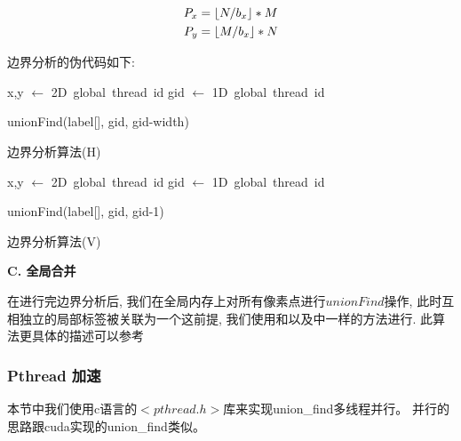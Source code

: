 \documentclass[a4paper, 11pt]{article}
\DeclarePairedDelimiter{\floor}{\lfloor}{\rfloor}
\begin{document}
\begin{equation}
\begin{split}
P_x &= \floor{N/b_x} * M \\
P_y &= \floor{M/b_x} * N
\end{split}
\end{equation}

边界分析的伪代码如下:

\begin{algorithm}[H]
	\DontPrintSemicolon
	x,y $\gets$ 2D\ global\ thread\ id \;
	gid $\gets$ 1D\ global\ thread\ id \;
	
	
	 {
		unionFind(label[], gid, gid-width)\;
	}
	\caption{边界分析算法(H)}
	\label{code:cuda_uf_2}
\end{algorithm}

\begin{algorithm}[H]
	\DontPrintSemicolon
	x,y $\gets$ 2D\ global\ thread\ id \;
	gid $\gets$ 1D\ global\ thread\ id \;
	
	
	 {
		unionFind(label[], gid, gid-1)\;
	}
	\caption{边界分析算法(V)}
	\label{code:cuda_uf_2}
\end{algorithm}

\textbf{C. 全局合并}

在进行完边界分析后, 我们在全局内存上对所有像素点进行$unionFind$操作, 此时互相独立的局部标签被关联为一个这前提, 
我们使用和\autocite{Yonehara2015}以及\autocite{Oliveira2010}中一样的方法进行. 
此算法更具体的描述可以参考\autocite{Galler:1964:IEA:364099.364331}

\subsubsection{Pthread 加速}

本节中我们使用c语言的$<pthread.h>$库来实现union\_find多线程并行。
并行的思路跟cuda实现的union\_find类似。
\end{document}
